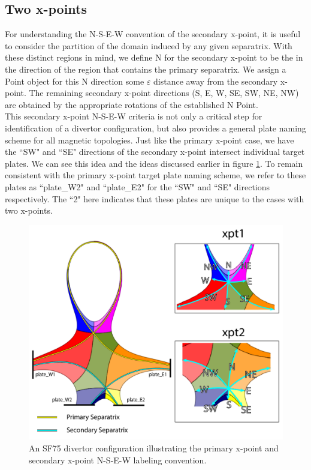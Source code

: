 \subsection{\label{sec:level2}Two x-points}
For understanding the N-S-E-W convention of the secondary x-point, it is useful to consider the partition of the domain induced by any given separatrix. With these distinct regions in mind, we define N for the secondary x-point to be the in the direction of the region that contains the primary separatrix. We assign a Point object for this N direction some $\varepsilon$ distance away from the secondary x-point. The remaining secondary x-point directions (S, E, W, SE, SW, NE, NW) are obtained by the appropriate rotations of the established N Point.\\ \indent
This secondary x-point N-S-E-W criteria is not only a critical step for identification of a divertor configuration, but also provides a general plate naming scheme for all magnetic topologies. Just like the primary x-point case, we have the ``SW" and ``SE" directions of the secondary x-point intersect individual target plates. We can see this idea and the ideas discussed earlier in figure \ref{fig:xpt_2_directions}. To remain consistent with the primary x-point target plate naming scheme, we refer to these plates as ``plate\_W2" and ``plate\_E2" for the ``SW" and ``SE" directions respectively. The ``2" here indicates that these plates are unique to the cases with two x-points.
\begin{figure}[H]
    \centering
    \includegraphics[width=\linewidth]{figures/xpt_2_directions.pdf}
    \caption{An SF75 divertor configuration illustrating the primary x-point and secondary x-point N-S-E-W labeling convention.}
    \label{fig:xpt_2_directions}
\end{figure}